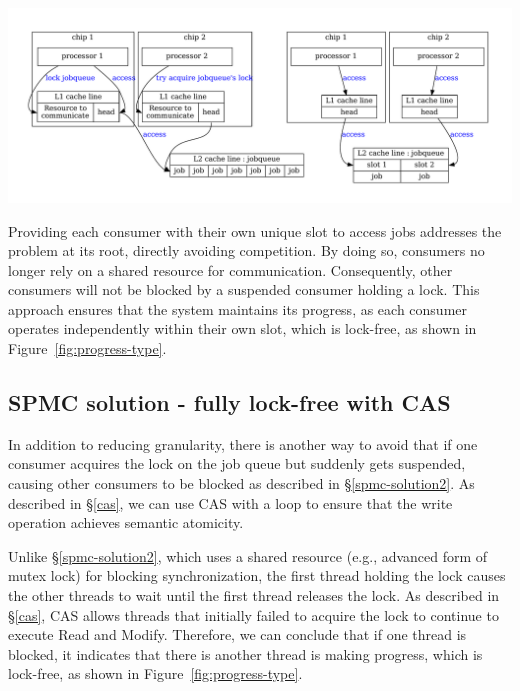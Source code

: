\documentclass[fontsize=10pt, oneside]{scrartcl}
\newcommand{\fig}[1]{Figure~\ref{#1}}
\newcommand{\secref}[1]{\hyperref[#1]{\textsc{\S}\ref*{#1}}}
\begin{document}
\includegraphics[keepaspectratio, width=1\linewidth]{images/spmc-solution3}
\label{fig:spmc-solution3}

Providing each consumer with their own unique slot to access jobs addresses the problem at its root, 
directly avoiding competition. 
By doing so, consumers no longer rely on a shared resource for communication.
Consequently, other consumers will not be blocked by a suspended consumer holding a lock.
This approach ensures that the system maintains its progress, 
as each consumer operates independently within their own slot, 
which is lock-free, as shown in \fig{fig:progress-type}.

\subsection{SPMC solution - fully lock-free with CAS}
\label{SPMC-solution4}
In addition to reducing granularity, 
there is another way to avoid that if one consumer acquires the lock on the job queue but suddenly gets suspended, 
causing other consumers to be blocked as described in \secref{spmc-solution2}. 
As described in \secref{cas}, we can use \textsc{CAS} with a loop to ensure that the write operation achieves semantic atomicity.

Unlike \secref{spmc-solution2}, 
which uses a shared resource (e.g., advanced form of mutex lock) for blocking synchronization, 
the first thread holding the lock causes the other threads to wait until the first thread releases the lock. 
As described in \secref{cas}, \textsc{CAS} allows threads that initially failed to acquire the lock to continue to execute Read and Modify. 
Therefore, we can conclude that if one thread is blocked, 
it indicates that there is another thread is making progress, 
which is lock-free, as shown in \fig{fig:progress-type}.
\end{document}
